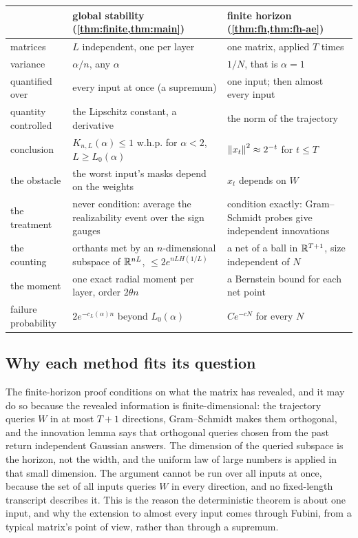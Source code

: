 \begin{center}
\begin{tabular}{p{}p{}p{}}
\toprule
 & global stability (\cref{thm:finite,thm:main}) & finite horizon (\cref{thm:fh,thm:fh-ae})\\
\midrule
matrices & $L$ independent, one per layer & one matrix, applied $T$ times\\
variance & $\alpha/n$, any $\alpha$ & $1/N$, that is $\alpha=1$\\
quantified over & every input at once (a supremum) & one input; then almost every input\\
quantity controlled & the Lipschitz constant, a derivative & the norm of the trajectory\\
conclusion & $K_{n,L}(\alpha)\le1$ w.h.p. for $\alpha<2$, $L\ge L_0(\alpha)$ & $\left\lVert x_t\right\rVert^2\approx2^{-t}$ for $t\le T$\\
the obstacle & the worst input's masks depend on the weights & $x_t$ depends on $W$\\
the treatment & never condition: average the realizability event over the sign gauges & condition exactly: Gram--Schmidt probes give independent innovations\\
the counting & orthants met by an $n$-dimensional subspace of $\mathbb{R}^{nL}$, $\le 2e^{nLH(1/L)}$ & a net of a ball in $\mathbb{R}^{T+1}$, size independent of $N$\\
the moment & one exact radial moment per layer, order $2\theta n$ & a Bernstein bound for each net point\\
failure probability & $2e^{-c_L(\alpha)n}$ beyond $L_0(\alpha)$ & $Ce^{-cN}$ for every $N$\\
\bottomrule
\end{tabular}
\end{center}

\subsection{Why each method fits its question}

The finite-horizon proof conditions on what the matrix has revealed, and it may do so because the revealed information is finite-dimensional: the trajectory queries $W$ in at most $T+1$ directions, Gram--Schmidt makes them orthogonal, and the innovation lemma says that orthogonal queries chosen from the past return independent Gaussian answers. The dimension of the queried subspace is the horizon, not the width, and the uniform law of large numbers is applied in that small dimension. The argument cannot be run over all inputs at once, because the set of all inputs queries $W$ in every direction, and no fixed-length transcript describes it. This is the reason the deterministic theorem is about one input, and why the extension to almost every input comes through Fubini, from a typical matrix's point of view, rather than through a supremum.

